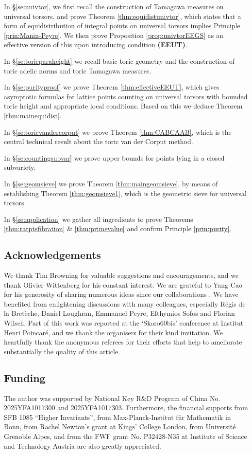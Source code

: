 \documentclass[11pt,letterpaper]{amsart}
\theoremstyle{plain}
\numberwithin{equation}{section}
\theoremstyle{definition}
\theoremstyle{remark}
\begin{document}
In \S\ref{se:univtor}, we first recall the construction of Tamagawa measures on universal torsors, and prove Theorem \ref{thm:equidistunivtor}, which states that a form of equidistribution of integral points on universal torsors implies Principle \ref{prin:Manin-Peyre}. We then prove Proposition \ref{prop:univtorEEGS} as an effective version of this upon introducing condition \textbf{(EEUT)}.

In \S\ref{se:toricparaheight} we recall basic  toric geometry and the construction of toric adelic norms and toric Tamagawa measures.

In \S\ref{se:purityproof} we prove Theorem \ref{thm:effectiveEEUT}, which gives asymptotic formulas for lattice points counting on universal torsors with bounded toric height and appropriate local conditions. Based on this we deduce Theorem \ref{thm:mainequidist}.

In \S\ref{se:toricvandercorput} we prove Theorem \ref{thm:CABCAAB}, which is the central technical result about the toric van der Corput method. 

In \S\ref{se:countingsubvar} we prove upper bounds for points lying in a closed subvariety.

In \S\ref{se:geomsieve} we prove Theorem \ref{thm:maingeomsieve}, by means of establishing Theorem \ref{thm:geomsieve1}, which is the geometric sieve for universal torsors. 

In \S\ref{se:application} we gather all ingredients to prove Theorems \ref{thm:ratptsfibration} \& \ref{thm:primevalue} and confirm Principle \ref{prin:purity}.


\subsection*{Acknowledgements}
We thank Tim Browning for valuable suggestions and encouragements, and we thank Olivier Wittenberg for his constant interest. We are grateful to Yang Cao for his generosity of sharing numerous ideas since our collaborations \cite{Cao-Huang1,Cao-Huang2}. We have benefited from enlightening discussions with many colleagues, especially Régis de la Bretèche,  Daniel Loughran, Emmanuel Peyre, Efthymios Sofos and Florian Wilsch. Part of this work was reported at the `Skoro60bis' conference at Institut Henri Poincaré, and we thank the organisers for their kind invitation.   We heartfully thank the anonymous referees for their efforts that help to ameliorate substantially the quality of this article.

\subsection*{Funding} The author was supported by National Key R\&D Program of China No. 2025YFA1017300 and 2025YFA1017303. Furthermore, the financial supports from SFB 1085 ``Higher Invariants'', from Max-Planck-Institut für Mathematik in Bonn, from Rachel Newton's grant at Kings' College London, from Université Grenoble Alpes, and from the FWF grant No. P32428-N35 at Institute of Science and Technology Austria are also greatly appreciated.
\end{document}

